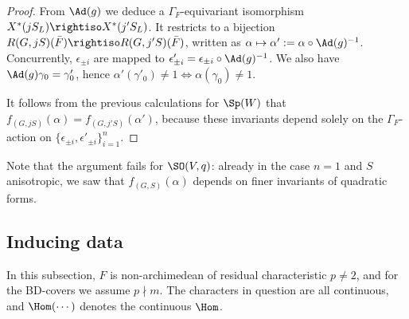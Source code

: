 \documentclass[a4paper,10pt]{article}
\begin{document}
\begin{proof}
	From $\Ad(g)$ we deduce a $\Gamma_F$-equivariant isomorphism $X^*(jS_L) \rightiso X^*(j'S_L)$. It restricts to a bijection $R(G, jS)(\bar{F}) \rightiso R(G, j'S)(\bar{F})$, written as $\alpha \mapsto \alpha' := \alpha \circ \Ad(g)^{-1}$. Concurrently, $\epsilon_{\pm i}$ are mapped to $\epsilon'_{\pm i} = \epsilon_{\pm i} \circ \Ad(g)^{-1}$. We also have $\Ad(g)\gamma_0 = \gamma'_0$, hence $\alpha'(\gamma'_0) \neq 1 \iff \alpha(\gamma_0) \neq 1$.
	
	It follows from the previous calculations for $\Sp(W)$ that $f_{(G, jS)}(\alpha) = f_{(G, j'S)}(\alpha')$, because these invariants depend solely on the $\Gamma_F$-action on $\{ \epsilon_{\pm i}, \epsilon'_{\pm i} \}_{i=1}^n$.
\end{proof}
Note that the argument fails for $\SO(V,q)$: already in the case $n=1$ and $S$ anisotropic, we saw that $f_{(G,S)}(\alpha)$ depends on finer invariants of quadratic forms.

\subsection{Inducing data}\label{sec:inducing-data}
In this subsection, $F$ is non-archimedean of residual characteristic $p \neq 2$, and for the BD-covers we assume $p \nmid m$. The characters in question are all continuous, and $\Hom(\cdots)$ denotes the continuous $\Hom$.
\end{document}
